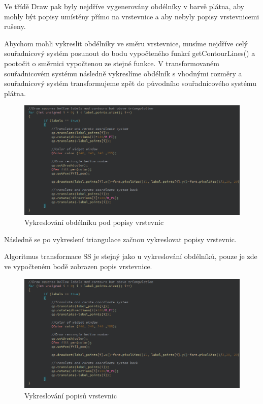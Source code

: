 \documentclass[11pt]{article}
\begin{document}
Ve třídě Draw pak byly nejdříve vygenerovány obdélníky v barvě plátna, aby mohly být popisy umístěny přímo na vrstevnice a aby nebyly popisy vrstevnicemi rušeny. 

Abychom mohli vykreslit obdélníky ve směru vrstevnice, musíme nejdříve celý souřadnicový systém posunout do bodu vypočteného funkcí getContourLines() a pootočit o směrnici vypočtenou ze stejné funkce. V transformovaném souřadnicovém systému následně vykreslíme obdélník s vhodnými rozměry a souřadnicový systém transformujeme zpět do původního souřadnicového systému plátna.

\begin{figure}[htbh]
	\centering
	\includegraphics[scale=0.5]{images/DrawLabelSquares.png} 
	\caption{Vykreslování obdélníku pod popisy vrstevnic}
	\label{fig:DrawLabelSquares}
\end{figure} 

Následně se po vykreslení triangulace začnou vykreslovat popisy vrstevnic. 

Algoritmus transformace SS je stejný jako u vykreslování obdélníků, pouze je zde ve vypočteném bodě zobrazen popis vrstevnice.

\begin{figure}[htbh]
	\centering
	\includegraphics[scale=0.5]{images/DrawLabelSquares.png} 
	\caption{Vykreslování popisů vrstevnic}
	\label{fig:DrawLabels}
\end{figure}
\end{document}
